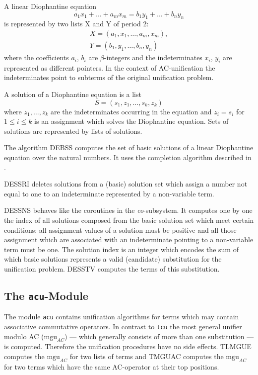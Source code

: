 A linear Diophantine equation
\[ a_1 x_1 + \ldots + a_m x_m = b_1 y_1 + \ldots + b_n y_n \]
is represented by two lists X and Y of period 2:
\[ \begin{array}{lcl}
   X = (a_1, x_1, \ldots, a_m,x_m), \\
   Y = (b_1, y_1, \ldots, b_n,y_n)
   \end{array}
\]
where the coefficients $a_i$, $b_i$ are $\beta$-integers and the 
indeterminates $x_i$, $y_i$ are represented as different pointers.
In the context of AC-unification the indeterminates point to subterms of the
original unification problem.

A solution of a Diophantine equation is a list
\[ S = ( s_1, z_1, \ldots, s_k,z_k) \]
where $z_1, \ldots, z_k$ are the indeterminates occurring in the equation and 
\( z_i=s_i \) for \( 1 \leq i \leq k \) is an assignment which solves the 
Diophantine equation.
Sets of solutions are represented by lists of solutions.

The algorithm DEBSS computes the set of basic solutions of a linear
Diophantine equation over the natural numbers.
It uses the completion algorithm described in \cite{Fortenbacher:83}.

DESSRI deletes solutions from a (basic) solution set which assign a number not
equal to one to an indeterminate represented by a non-variable term.

DESSNS behaves like the coroutines in the {\it co}-subsystem.
It computes one by one the index of all solutions composed
from the basic solution set which meet certain conditions:
all assignment values of a solution must be positive and all those
assignment which are associated with an indeterminate pointing to
a non-variable term must be one.
The solution index is an integer which encodes the sum of which basic
solutions represents a valid (candidate) substitution for the unification 
problem.
DESSTV computes the terms of this substitution.

\subsection{The {\tt acu}-Module}

The module {\tt acu} contains unification algorithms for terms which may 
contain associative commutative operators.
In contrast to {\tt tcu} the most general unifier modulo AC ($\mbox{mgu}_{AC}$)
--- which generally consists of more than one substitution --- is computed.
Therefore the unification procedures have no side effects.
TLMGUE computes the $\mbox{mgu}_{AC}$ for two lists of terms and TMGUAC
computes the $\mbox{mgu}_{AC}$ for two terms which have the same AC-operator 
at their top positions.

